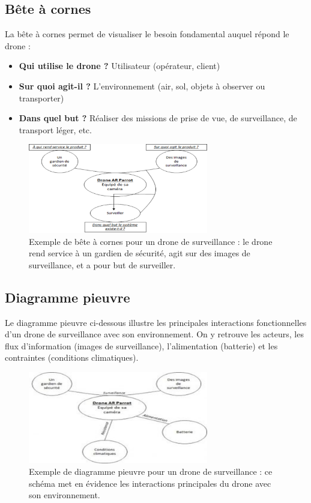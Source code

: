 \documentclass[a4paper,12pt]{report}
\begin{document}
\subsection{Bête à cornes}
La bête à cornes permet de visualiser le besoin fondamental auquel répond le drone :

\begin{itemize}
    \item \textbf{Qui utilise le drone ?} \quad Utilisateur (opérateur, client)
    \item \textbf{Sur quoi agit-il ?} \quad L'environnement (air, sol, objets à observer ou transporter)
    \item \textbf{Dans quel but ?} \quad Réaliser des missions de prise de vue, de surveillance, de transport léger, etc.
\end{itemize}

\begin{figure}[H]
    \centering
    \includegraphics[width=0.7\textwidth]{images/bete_a_corne_surveillance.png}
    \caption{Exemple de bête à cornes pour un drone de surveillance : le drone rend service à un gardien de sécurité, agit sur des images de surveillance, et a pour but de surveiller.}
    \label{fig:bete_a_corne_surveillance}
\end{figure}

\subsection{Diagramme pieuvre}
Le diagramme pieuvre ci-dessous illustre les principales interactions fonctionnelles d'un drone de surveillance avec son environnement. On y retrouve les acteurs, les flux d'information (images de surveillance), l'alimentation (batterie) et les contraintes (conditions climatiques).

\begin{figure}[H]
    \centering
    \includegraphics[width=0.7\textwidth]{images/diagramme_pieuvre_surveillance.png}
    \caption{Exemple de diagramme pieuvre pour un drone de surveillance : ce schéma met en évidence les interactions principales du drone avec son environnement.}
    \label{fig:diagramme_pieuvre_surveillance}
\end{figure}
\end{document}
